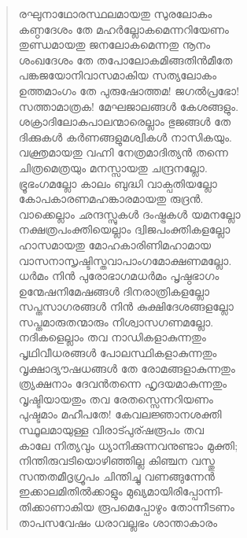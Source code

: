 \begin{verse}
രഘുനാഥോരസ്ഥലമായതു സുരലോകം\\
കണ്ഠദേശം തേ മഹര്‍ല്ലോകമെന്നറിയേണം\\
തുണ്ഡമായതു ജനലോകമെന്നതു നൂനം\\
ശംഖദേശം തേ തപോലോകമിങ്ങതിന്‍മീതേ\\
പങ്കജയോനിവാസമാകിയ സത്യലോകം\\
ഉത്തമാംഗം തേ പുരുഷോത്തമ! ജഗല്‍പ്രഭോ!\\
സത്താമാത്രക! മേഘജാലങ്ങള്‍ കേശങ്ങളും.\\
ശക്രാദിലോകപാലന്മാരെല്ലാം ഭുജങ്ങള്‍ തേ\\
ദിക്കുകള്‍ കര്‍ണങ്ങളുമശ്വികള്‍ നാസികയും.\\
വക്ത്രമായതു വഹ്നി നേത്രമാദിത്യന്‍ തന്നെ\\
ചിത്രമെത്രയും മനസ്സായതു ചന്ദ്രനല്ലോ.\\
ഭ്രൂഭംഗമല്ലോ കാലം ബുദ്ധി വാക്പതിയല്ലോ\\
കോപകാരണമഹങ്കാരമായതു രുദ്രന്‍.\\
വാക്കെല്ലാം ഛന്ദസ്സുകള്‍ ദംഷ്ട്രകള്‍ യമനല്ലോ\\
നക്ഷത്രപംക്തിയെല്ലാം ദ്വിജപംക്തികളല്ലോ\\
ഹാസമായതു മോഹകാരിണിമഹാമായ\\
വാസനാസൃഷ്ടിസ്തവാപാംഗമോക്ഷണമല്ലോ.\\
ധര്‍മം നിന്‍ പുരോഭാഗമധര്‍മം പൃഷ്ഠഭാഗം\\
ഉന്മേഷനിമേഷങ്ങള്‍ ദിനരാത്രികളല്ലോ\\
സപ്തസാഗരങ്ങള്‍ നിന്‍ കുക്ഷിദേശങ്ങളല്ലോ\\
സപ്തമാരുതന്മാരും നിശ്വാസഗണമല്ലോ.\\
നദികളെല്ലാം തവ നാഡികളാകുന്നതും\\
പൃഥിവീധരങ്ങള്‍ പോലസ്ഥികളാകുന്നതും\\
വൃക്ഷാദ്യൗഷധങ്ങള്‍ തേ രോമങ്ങളാകുന്നതും\\
ത്ര്യക്ഷനാം ദേവന്‍തന്നെ ഹൃദയമാകുന്നതും\\
വൃഷ്ടിയായതും തവ രേതസ്സെന്നറിയണം\\
പുഷ്ടമാം മഹീപതേ! കേവലജ്ഞാനശക്തി\\
സ്ഥൂലമായുള്ള വിരാട്പുര്ഷരൂപം തവ\\
കാലേ നിത്യവും ധ്യാനിക്കുന്നവനുണ്ടാം മുക്തി;\\
നിന്തിരുവടിയൊഴിഞ്ഞില്ല കിഞ്ചന വസ്തു\\
സന്തതമീദൃഗ്രൂപം ചിന്തിച്ചു വണങ്ങുന്നേന്‍\\
ഇക്കാലമിതില്‍ക്കാളും മുഖ്യമായിരിപ്പോന്നി-\\
തിക്കാണാകിയ രൂപമെപ്പോഴും തോന്നീടണം\\
താപസവേഷം ധരാവല്ലഭം ശാന്താകാരം\\

\end{verse}

